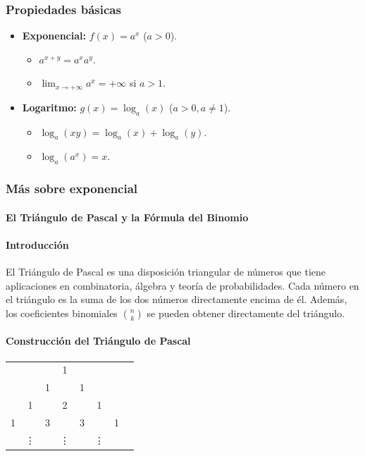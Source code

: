 \documentclass[12pt, a4paper]{article}
\theoremstyle{rioplatense}
\begin{document}
\subsubsection{Propiedades básicas}
\begin{itemize}
    \item \textbf{Exponencial:} \( f(x) = a^x \) (\( a > 0 \)).
    \begin{itemize}
        \item \( a^{x+y} = a^x a^y \).
        \item \( \lim_{x \to +\infty} a^x = +\infty \) si \( a > 1 \).
    \end{itemize}
    \item \textbf{Logaritmo:} \( g(x) = \log_a(x) \) (\( a > 0, a \neq 1 \)).
    \begin{itemize}
        \item \( \log_a(xy) = \log_a(x) + \log_a(y) \).
        \item \( \log_a(a^x) = x \).
    \end{itemize}
\end{itemize}

\subsubsection{M\'as sobre exponencial}

\paragraph{El Triángulo de Pascal y la Fórmula del Binomio}

\paragraph{Introducción}
El Triángulo de Pascal es una disposición triangular de números que tiene aplicaciones en combinatoria, álgebra y teoría de probabilidades. Cada número en el triángulo es la suma de los dos números directamente encima de él. Además, los coeficientes binomiales \(\binom{n}{k}\) se pueden obtener directamente del triángulo.

\paragraph{Construcción del Triángulo de Pascal}
\begin{center}
\begin{tabular}{cccccccc}
& & & 1 & & & & \\
& & 1 & & 1 & & & \\
& 1 & & 2 & & 1 & & \\
1 & & 3 & & 3 & & 1 & \\
& \vdots & & \vdots & & \vdots & & \\
\end{tabular}
\end{center}
\end{document}
